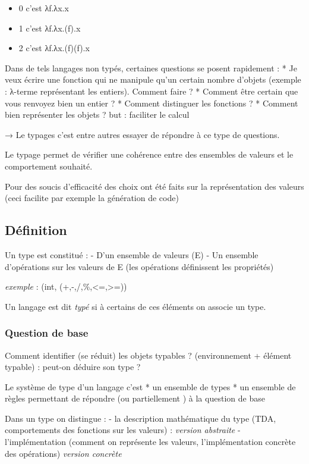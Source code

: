 \documentclass[]{article}
\providecommand{\tightlist}{%
  \setlength{\itemsep}{0pt}\setlength{\parskip}{0pt}}
\begin{document}
\begin{itemize}
\tightlist
\item
  0 c'est λf.λx.x
\item
  1 c'est λf.λx.(f).x
\item
  2 c'est λf.λx.(f)(f).x
\end{itemize}

Dans de tels langages non typés, certaines questions se posent
rapidement : * Je veux écrire une fonction qui ne manipule qu'un certain
nombre d'objets (exemple : λ-terme représentant les entiers). Comment
faire ? * Comment être certain que vous renvoyez bien un entier ? *
Comment distinguer les fonctions ? * Comment bien représenter les objets
? but : faciliter le calcul

→ Le typages c'est entre autres essayer de répondre à ce type de
questions.

Le typage permet de vérifier une cohérence entre des ensembles de
valeurs et le comportement souhaité.

Pour des soucis d'efficacité des choix ont été faits sur la
représentation des valeurs (ceci facilite par exemple la génération de
code)

\subsection{Définition}\label{duxe9finition}

Un type est constitué : - D'un ensemble de valeurs (E) - Un ensemble
d'opérations sur les valeurs de E (les opérations définissent les
propriétés)

\emph{exemple} : (int, (+,-,/,\%,\textless{}=,\textgreater{}=))

Un langage est dit \emph{typé} si à certains de ces éléments on associe
un type.

\subsubsection{Question de base}\label{question-de-base}

Comment identifier (se réduit) les objets typables ? (environnement +
élément typable) : peut-on déduire son type ?

Le système de type d'un langage c'est * un ensemble de types * un
ensemble de règles permettant de répondre (ou partiellement ) à la
question de base

Dans un type on distingue : - la description mathématique du type (TDA,
comportements des fonctions sur les valeurs) : \emph{version abstraite}
- l'implémentation (comment on représente les valeurs, l'implémentation
concrète des opérations) \emph{version concrète}
\end{document}

